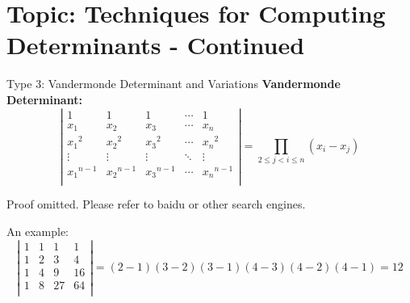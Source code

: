 \documentclass{beamer}
\begin{document}
\section{Topic: Techniques for Computing Determinants - Continued}
\begin{frame}{Type 3: Vandermonde Determinant and Variations}
\textbf{Vandermonde Determinant:}
\begin{equation*}
    \left| \begin{matrix}
        1&		1&		1&		\cdots&		1\\
        x_1&		x_2&		x_3&		\cdots&		x_n\\
        {x_1}^2&		{x_2}^2&		{x_3}^2&		\cdots&		{x_n}^2\\
        \vdots&		\vdots&		\vdots&		\ddots&		\vdots\\
        {x_1}^{n-1}&		{x_2}^{n-1}&		{x_3}^{n-1}&		\cdots&		{x_n}^{n-1}\\
    \end{matrix} \right|=\prod_{2\leqslant j<i\leqslant n}{\left( x_i-x_j \right)}
\end{equation*}

Proof omitted. Please refer to baidu or other search engines.

\vspace{3pt}
An example:
\begin{equation*}
    \left| \begin{matrix}
        1&		1&		1&		1\\
        1&		2&		3&		4\\
        1&		4&		9&		16\\
        1&		8&		27&		64\\
    \end{matrix} \right|=\left( 2-1 \right) \left( 3-2 \right) \left( 3-1 \right) \left( 4-3 \right) \left( 4-2 \right) \left( 4-1 \right) =12
\end{equation*}
\end{frame}
\end{document}
